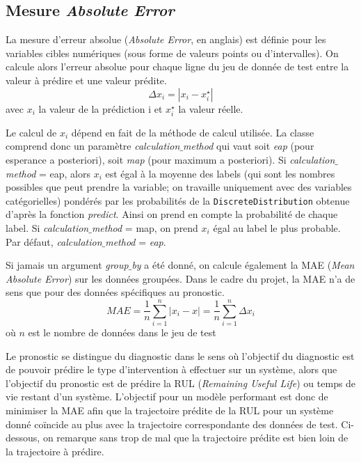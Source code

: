 \subsection{Mesure \textit{Absolute Error}}

La mesure d’erreur absolue (\textit{Absolute Error}, en anglais) est définie pour les variables cibles numériques (sous forme de valeurs points ou d’intervalles). On calcule alors l’erreur absolue pour chaque ligne du jeu de donnée de test entre la valeur à prédire et une valeur prédite.
$$\Delta x_{i} = |x_{i}-x^{\star}_{i}|$$
avec $x_{i}$ la valeur de la prédiction i et $x^{\star}_{i}$ la valeur réelle.

Le calcul de $x_{i}$ dépend en fait de la méthode de calcul utilisée. La classe comprend donc un paramètre \textit{calculation$\_$method} qui vaut soit \textit{eap} (pour esperance a posteriori), soit \textit{map} (pour maximum a posteriori). Si \textit{calculation$\_$method} = eap, alors $x_{i}$ est égal à la moyenne des labels (qui sont les nombres possibles que peut prendre la variable; on travaille uniquement avec des variables catégorielles) pondérés par les probabilités de la \texttt{DiscreteDistribution} obtenue d’après la fonction \textit{predict}. Ainsi on prend en compte la probabilité de chaque label. Si \textit{calculation$\_$method} = map, on prend $x_{i}$ égal au label le plus probable. Par défaut, \textit{calculation$\_$method} = \textit{eap}.

Si jamais un argument \textit{group$\_$by} a été donné, on calcule également la MAE (\textit{Mean Absolute Error}) sur les données groupées. Dans le cadre du projet, la MAE n’a de sens que pour des données spécifiques au pronostic. 
$$MAE = \frac{1}{n}\sum_{i=1}^{n}|x_{i}-x|=\frac{1}{n}\sum_{i=1}^{n}\Delta x_{i}$$
où $n$ est le nombre de données dans le jeu de test

Le pronostic se distingue du diagnostic dans le sens où l’objectif du diagnostic est de pouvoir prédire le type d’intervention à effectuer sur un système, alors que l’objectif du pronostic est de prédire la RUL (\textit{Remaining Useful Life}) ou temps de vie restant d’un système. 
L’objectif pour un modèle performant est donc de minimiser la MAE afin que la trajectoire prédite de la RUL pour un système donné coïncide au plus avec la trajectoire correspondante des données de test. Ci-dessous, on remarque sans trop de mal que la trajectoire prédite est bien loin de la trajectoire à prédire.

